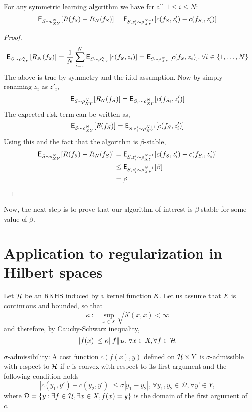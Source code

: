 \begin{lemma}
	For any symmetric learning algorithm we have for all $1\leq i \leq N$:
	\[
	{\sf E}_{S \sim \rho^N_{XY}} [R(f_S) - R_N(f_S)] = {\sf E}_{S,z'_i \sim \rho^{N+1}_{XY}} [c(f_S,z'_i) - c(f_{S_i}, z'_i)]
	\]
	\begin{proof}
		\[
		{\sf E}_{S \sim \rho^N_{XY}} [R_N(f_S)] = \frac{1}{N} \sum_{i=1}^N {\sf E}_{S \sim \rho^N_{XY}} [c(f_S, z_i)] = {\sf E}_{S \sim \rho^N_{XY}} [c(f_S, z_i)], \, \forall i \in \{1,\dots, N\}
		\]
		The above is true by symmetry and the i.i.d assumption. Now by simply renaming $z_i$ as $z'_i$,
		\[
		{\sf E}_{S \sim \rho^N_{XY}}[R_N(f_S)] = {\sf E}_{S_i \sim \rho^N_{XY}}[c(f_{S_i}, z'_i)]
		\]
		The expected risk term can be written as, 
		\[
		{\sf E}_{S \sim \rho^N_{XY}}[R(f_S)] = {\sf E}_{S,z'_i \sim \rho^{N+1}_{XY}} [c(f_S, z'_i)]
		\]
		Using this and the fact that the algorithm is $\beta$-stable, 
		\[
		\begin{aligned}
		{\sf E}_{S \sim \rho^N_{XY}} [R(f_S) - R_N(f_S)] &= {\sf E}_{S,z'_i\sim \rho^{N+1}_{XY}}[c(f_S,z'_i) - c(f_{S_i},z'_i)]\\
		&\leq {\sf E}_{S,z'_i\sim \rho^{N+1}_{XY}}[\beta] \\
		& = \beta
		\end{aligned}
		\]
	\end{proof}
\end{lemma}
Now, the next step is to prove that our algorithm of interest is $\beta$-stable for some value of $\beta$. 

\section{Application to regularization in Hilbert spaces}
Let ${\cal H}$ be an RKHS induced by a kernel function $K$. Let us assume that $K$ is continuous and bounded, so that
\[
\kappa := \sup_{x \in X} \sqrt{K(x,x)} < \infty
\]
and therefore, by Cauchy-Schwarz inequality,
\begin{equation}
|f(x)| \leq \kappa \|f\|_\clH, \, \forall x \in X, \forall f \in \clH 
\label{e:cauchy_schwarz}
\end{equation}

\noindent $\sigma$-admissibility: A cost function $c(f(x),y)$ defined on ${\cal H} \times Y$ is $\sigma$-admissible with respect to ${\cal H}$ if $c$ is convex with respect to its first argument and the following condition holds
\[
|c(y_1, y') - c(y_2, y')| \leq \sigma |y_1 - y_2|, \, \forall y_1,y_2 \in \mathcal{D}, \forall y' \in Y,
\]
where $\mathcal{D} = \{y: \exists f \in {\cal H}, \exists x \in X, f(x) = y\}$ is the domain of the first argument of $c$.  

